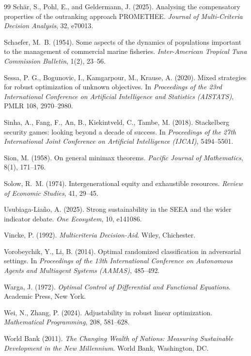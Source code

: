 \documentclass[preprint,11pt,authoryear]{elsarticle}
\theoremstyle{definition}
\theoremstyle{remark}
\begin{document}
\begin{thebibliography}{99}
 Sch\"ar, S., Pohl, E., and Geldermann, J. (2025). Analysing the compensatory properties of the outranking approach PROMETHEE. \emph{Journal of Multi-Criteria Decision Analysis}, 32, e70013.

 Schaefer, M.~B. (1954). Some aspects of the dynamics of populations important to the management of commercial marine fisheries. \emph{Inter-American Tropical Tuna Commission Bulletin}, 1(2), 23--56.

 Sessa, P. G., Bogunovic, I., Kamgarpour, M., Krause, A. (2020). Mixed strategies for robust optimization of unknown objectives. In \emph{Proceedings of the 23rd International Conference on Artificial Intelligence and Statistics (AISTATS)}, PMLR 108, 2970--2980.

 Sinha, A., Fang, F., An, B., Kiekintveld, C., Tambe, M. (2018). Stackelberg security games: looking beyond a decade of success. In \emph{Proceedings of the 27th International Joint Conference on Artificial Intelligence (IJCAI)}, 5494--5501.

 Sion, M. (1958). On general minimax theorems. \emph{Pacific Journal of Mathematics}, 8(1), 171--176.

 Solow, R.~M. (1974). Intergenerational equity and exhaustible resources. \emph{Review of Economic Studies}, 41, 29--45.

 Usubiaga-Lia\~no, A. (2025). Strong sustainability in the SEEA and the wider indicator debate. \emph{One Ecosystem}, 10, e141086.

 Vincke, P. (1992). \emph{Multicriteria Decision-Aid}. Wiley, Chichester.

 Vorobeychik, Y., Li, B. (2014). Optimal randomized classification in adversarial settings. In \emph{Proceedings of the 13th International Conference on Autonomous Agents and Multiagent Systems (AAMAS)}, 485--492.

 Warga, J. (1972). \emph{Optimal Control of Differential and Functional Equations}. Academic Press, New York.

 Wei, N., Zhang, P. (2024). Adjustability in robust linear optimization. \emph{Mathematical Programming}, 208, 581--628.

 World Bank (2011). \emph{The Changing Wealth of Nations: Measuring Sustainable Development in the New Millennium}. World Bank, Washington, DC.

\end{thebibliography}
\end{document}
